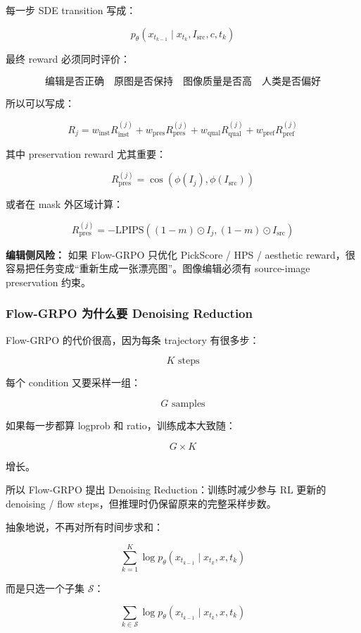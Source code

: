 每一步 SDE transition 写成：

\[
p_\theta
\left(
x_{t_{k-1}}
\mid
x_{t_k},
I_\text{src},
c,
t_k
\right)
\]

最终 reward 必须同时评价：

\[
\text{编辑是否正确}
\quad
\text{原图是否保持}
\quad
\text{图像质量是否高}
\quad
\text{人类是否偏好}
\]

所以可以写成：

\[
R_j
=
w_\text{inst}R_\text{inst}^{(j)}
+
w_\text{pres}R_\text{pres}^{(j)}
+
w_\text{qual}R_\text{qual}^{(j)}
+
w_\text{pref}R_\text{pref}^{(j)}
\]

其中 preservation reward 尤其重要：

\[
R_\text{pres}^{(j)}
=
\cos
\left(
\phi(I_j),
\phi(I_\text{src})
\right)
\]

或者在 mask 外区域计算：

\[
R_\text{pres}^{(j)}
=
-
\text{LPIPS}
\left(
(1-m)\odot I_j,
(1-m)\odot I_\text{src}
\right)
\]

\begin{warnbox}
\textbf{编辑侧风险：} 如果 Flow-GRPO 只优化 PickScore / HPS / aesthetic reward，很容易把任务变成“重新生成一张漂亮图”。图像编辑必须有 source-image preservation 约束。
\end{warnbox}

\subsubsection{Flow-GRPO 为什么要 Denoising Reduction}

Flow-GRPO 的代价很高，因为每条 trajectory 有很多步：

\[
K\text{ steps}
\]

每个 condition 又要采样一组：

\[
G\text{ samples}
\]

如果每一步都算 logprob 和 ratio，训练成本大致随：

\[
G\times K
\]

增长。

所以 Flow-GRPO 提出 Denoising Reduction：训练时减少参与 RL 更新的 denoising / flow steps，但推理时仍保留原来的完整采样步数。

抽象地说，不再对所有时间步求和：

\[
\sum_{k=1}^{K}
\log p_\theta(x_{t_{k-1}}\mid x_{t_k},x,t_k)
\]

而是只选一个子集 $\mathcal{S}$：

\[
\sum_{k\in\mathcal{S}}
\log p_\theta(x_{t_{k-1}}\mid x_{t_k},x,t_k)
\]

